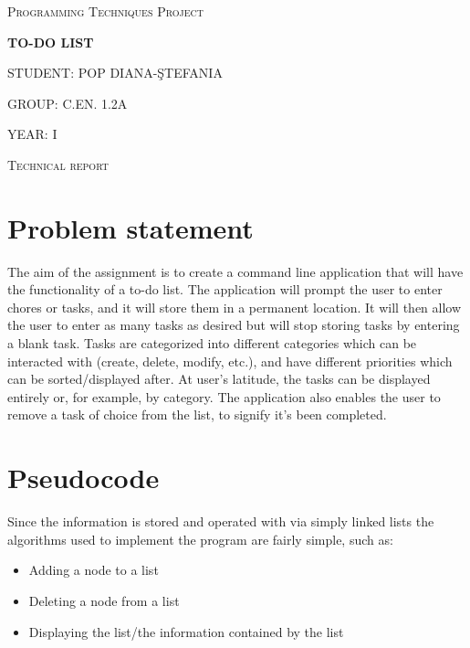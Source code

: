 \documentclass{article}
\begin{document}
\begin{titlepage}
	\centering
    \vspace{3cm}
	{\scshape\Large Programming Techniques Project \par}
	\vspace{4cm}
	{\huge\bfseries\LARGE TO-DO LIST \par}
	\vspace{2cm}
	{\Large STUDENT: POP DIANA-\c{S}TEFANIA\par}
	\vspace{1cm}
	{\Large GROUP: C.EN. 1.2A\par}
	\vspace{1cm}
	{\Large YEAR: I\par}
	\vspace{1cm}
	\vfill
\end{titlepage}

\begin{centering}
\vspace{1cm}
{\scshape\Large Technical report \par}
\end{centering}
\vspace{1.5cm}
\section{Problem statement}
The aim of the assignment is to create a command line application that will have the functionality of a to-do list. The application will prompt the user to enter chores or tasks, and it will store them in a permanent location. It will then allow the user to enter as many tasks as desired but will stop storing tasks by entering a blank task. Tasks are categorized into different categories which can be interacted with (create, delete, modify, etc.), and have different priorities which can be sorted/displayed after. At user's latitude, the tasks can be displayed entirely or, for example, by category. The application also enables the user to remove a task of choice from the list, to signify it's been completed.

\section{Pseudocode}

Since the information is stored and operated with via simply linked lists the algorithms used to implement the program are fairly simple,  such as:
    \begin{itemize}
        \item Adding a node to a list
        
        \item Deleting a node from a list
        
        \item Displaying the list/the information contained by the list
    \end{itemize}
\end{document}
